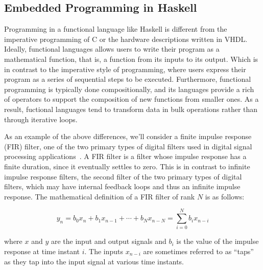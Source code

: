 
\subsection{Embedded Programming in Haskell}

Programming in a functional language like Haskell is different from the imperative programming of C or the hardware descriptions written in VHDL. Ideally, functional languages allows users to write their program as a mathematical function, that is, a function from its inputs to its output. Which is in contrast to the imperative style of programming, where users express their program as a series of sequential steps to be executed. Furthermore, functional programming is typically done compositionally, and its languages provide a rich of operators to support the composition of new functions from smaller ones. As a result, fuctional languages tend to transform data in bulk operations rather than through iterative loops.

As an example of the above differences, we'll consider a finite impulse response (FIR) filter, one of the two primary types of digital filters used in digital signal processing applications~\cite{oppenheim1989}. A FIR filter is a filter whose impulse response has a finite duration, since it eventually settles to zero. This is in contrast to infinite impulse response filters, the second filter of the two primary types of digital filters, which may have internal feedback loops and thus an infinite impulse response. The mathematical definition of a FIR filter of rank $N$ is as follows:

\vspace{-2mm}
\begin{equation}
y_{n} = b_{0} x_{n} + b_{1} x_{n-1} + \cdots + b_{N} x_{n-N} = \sum_{i=0}^{N} b_{i} x_{n-i}
\end{equation}
\vspace{1mm}

\noindent where $x$ and $y$ are the input and output signals and $b_i$ is the value of the impulse response at time instant $i$. The inputs $x_{n-i}$ are sometimes referred to as ``taps'' as they tap into the input signal at various time instants. 

